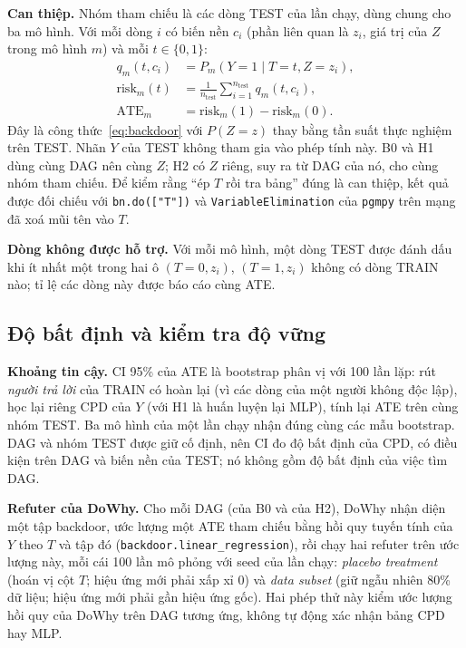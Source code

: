 \documentclass[pdflatex,sn-mathphys-num]{sn-jnl}%
\newcommand{\ATE}{\mathrm{ATE}}
\begin{document}
\textbf{Can thiệp.} Nhóm tham chiếu là các dòng TEST của lần chạy, dùng chung cho ba mô hình. Với mỗi dòng $i$ có biến nền $c_i$ (phần liên quan là $z_i$, giá trị của $Z$ trong mô hình $m$) và mỗi $t \in \{0,1\}$:
\begin{equation}\label{eq:std}
\begin{aligned}
q_m(t, c_i) &= P_m(Y{=}1 \mid T{=}t, Z{=}z_i),\\
\mathrm{risk}_m(t) &= \frac{1}{n_{\text{test}}}\sum_{i=1}^{n_{\text{test}}} q_m(t, c_i),\\
\ATE_m &= \mathrm{risk}_m(1) - \mathrm{risk}_m(0).
\end{aligned}
\end{equation}
Đây là công thức~\eqref{eq:backdoor} với $P(Z{=}z)$ thay bằng tần suất thực nghiệm trên TEST. Nhãn $Y$ của TEST không tham gia vào phép tính này. B0 và H1 dùng cùng DAG nên cùng $Z$; H2 có $Z$ riêng, suy ra từ DAG của nó, cho cùng nhóm tham chiếu. Để kiểm rằng ``ép $T$ rồi tra bảng'' đúng là can thiệp, kết quả được đối chiếu với \texttt{bn.do(["T"])} và \texttt{VariableElimination} của \texttt{pgmpy} trên mạng đã xoá mũi tên vào $T$.

\textbf{Dòng không được hỗ trợ.} Với mỗi mô hình, một dòng TEST được đánh dấu khi ít nhất một trong hai ô $(T{=}0, z_i)$, $(T{=}1, z_i)$ không có dòng TRAIN nào; tỉ lệ các dòng này được báo cáo cùng ATE.

\subsection{Độ bất định và kiểm tra độ vững}\label{sec:uncertainty}

\textbf{Khoảng tin cậy.} CI 95\% của ATE là bootstrap phân vị với 100 lần lặp: rút \emph{người trả lời} của TRAIN có hoàn lại (vì các dòng của một người không độc lập), học lại riêng CPD của $Y$ (với H1 là huấn luyện lại MLP), tính lại ATE trên cùng nhóm TEST. Ba mô hình của một lần chạy nhận đúng cùng các mẫu bootstrap. DAG và nhóm TEST được giữ cố định, nên CI đo độ bất định của CPD, có điều kiện trên DAG và biến nền của TEST; nó không gồm độ bất định của việc tìm DAG.

\textbf{Refuter của DoWhy.} Cho mỗi DAG (của B0 và của H2), DoWhy nhận diện một tập backdoor, ước lượng một ATE tham chiếu bằng hồi quy tuyến tính của $Y$ theo $T$ và tập đó (\texttt{backdoor.linear\_regression}), rồi chạy hai refuter trên ước lượng này, mỗi cái 100 lần mô phỏng với seed của lần chạy: \emph{placebo treatment} (hoán vị cột $T$; hiệu ứng mới phải xấp xỉ 0) và \emph{data subset} (giữ ngẫu nhiên 80\% dữ liệu; hiệu ứng mới phải gần hiệu ứng gốc). Hai phép thử này kiểm ước lượng hồi quy của DoWhy trên DAG tương ứng, không tự động xác nhận bảng CPD hay MLP.
\end{document}
